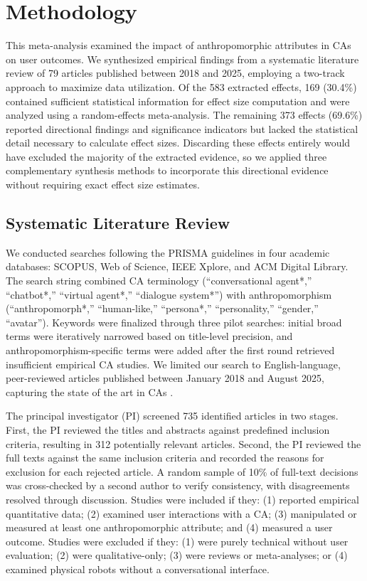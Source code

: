 \documentclass[preprint,review,12pt,authoryear,nonatbib]{elsarticle}
\begin{document}
\section{Methodology}
This meta-analysis examined the impact of anthropomorphic attributes in CAs on user outcomes. We synthesized empirical findings from a systematic literature review \parencite{amin2025anthropomorphism} of 79 articles published between 2018 and 2025, employing a two-track approach to maximize data utilization. Of the 583 extracted effects, 169 (30.4\%) contained sufficient statistical information for effect size computation and were analyzed using a random-effects meta-analysis. The remaining 373 effects (69.6\%) reported directional findings and significance indicators but lacked the statistical detail necessary to calculate effect sizes. Discarding these effects entirely would have excluded the majority of the extracted evidence, so we applied three complementary synthesis methods to incorporate this directional evidence without requiring exact effect size estimates.

\subsection{Systematic Literature Review}

We conducted searches following the PRISMA guidelines \parencite{page_prisma_2021} in four academic databases: SCOPUS, Web of Science, IEEE Xplore, and ACM Digital Library. The search string combined CA terminology (``conversational agent*,'' ``chatbot*,'' ``virtual agent*,'' ``dialogue system*'') with anthropomorphism (``anthropomorph*,'' ``human-like,'' ``persona*,'' ``personality,'' ``gender,'' \newline``avatar''). Keywords were finalized through three pilot searches: initial broad terms were iteratively narrowed based on title-level precision, and anthropomorphism-specific terms were added after the first round retrieved insufficient empirical CA studies. We limited our search to English-language, peer-reviewed articles published between January 2018 and August 2025, capturing the state of the art in CAs \parencite{zhang2018personalizing}. %

The principal investigator (PI) screened 735 identified articles in two stages. First, the PI reviewed the titles and abstracts against predefined inclusion criteria, resulting in 312 potentially relevant articles. Second, the PI reviewed the full texts against the same inclusion criteria and recorded the reasons for exclusion for each rejected article. A random sample of 10\% of full-text decisions was cross-checked by a second author to verify consistency, with disagreements resolved through discussion. Studies were included if they: (1) reported empirical quantitative data; (2) examined user interactions with a CA; (3) manipulated or measured at least one anthropomorphic attribute; and (4) measured a user outcome. Studies were excluded if they: (1) were purely technical without user evaluation; (2) were qualitative-only; (3) were reviews or meta-analyses; or (4) examined physical robots without a conversational interface.
\end{document}
